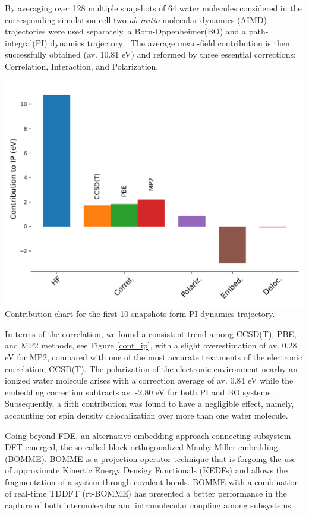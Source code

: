 \documentclass[notitlepage,12pt]{report}
\begin{document}
	By averaging over 128 multiple snapshots of 64 water molecules considered in the corresponding simulation cell two \textit{ab-initio} molecular dynamics (AIMD) trajectories were used separately, a Born-Oppenheimer(BO) and a path-integral(PI) dynamics trajectory \supercite{gaiduk2018electron}. The average mean-field contribution is then successfully obtained (av. 10.81 eV) and reformed by three essential corrections: Correlation, Interaction, and Polarization. 
	
\begin{minipage}{0.4\textwidth}
	\label{cont_ip}
	\includegraphics[width=\linewidth]{./images/contribution_liquidwater_PI}
	{Contribution chart for the first 10 snapshots form PI dynamics trajectory. \supercite{gaiduk2018electron}}
\end{minipage}
\begin{minipage}{0.55\textwidth}
	In terms of the correlation, we found a consistent trend among CCSD(T), PBE, and MP2 methods, see Figure \ref{cont_ip}, with a slight overestimation of av. 0.28 eV for MP2, compared with one of the most accurate treatments of the electronic correlation, CCSD(T). The polarization of the electronic environment nearby an ionized water molecule arises with a correction average of av. 0.84 eV while the embedding correction subtracts av. -2.80 eV for both PI and BO systems. Subsequently, a fifth contribution was found to have a negligible effect, namely, accounting for spin density delocalization over more than one water molecule. 
\end{minipage}
	
	Going beyond FDE, an alternative embedding approach connecting subsystem DFT emerged, the so-called block-orthogonalized Manby-Miller embedding (BOMME). BOMME is a projection operator technique that is forgoing the use of approximate Kinertic Energy Densigy Functionals (KEDFs) and allows the fragmentation of a system through covalent bonds\supercite{ding2017embedded}. BOMME with a combination of real-time TDDFT (rt-BOMME) has presented a better performance in the capture of both intermolecular and intramolecular coupling among subsystems \supercite{koh2017accelerating}.
	
\end{document}
